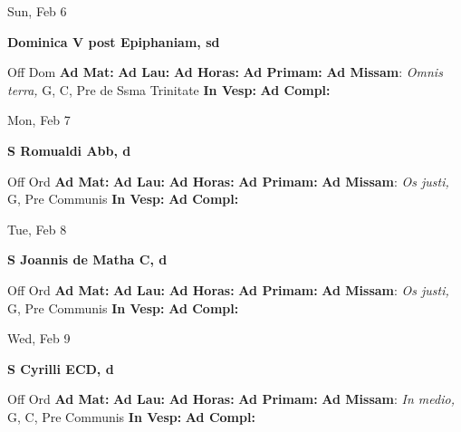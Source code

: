 \documentclass[10pt]{article}
\begin{document}
\begin{minipage}{3.5in}
\vspace{2em}\begin{center}
Sun, Feb 6
\end{center}\textbf{ \large Dominica V post Epiphaniam, \textnormal{\normalsize sd}}
\begin{justify}
Off Dom
\textbf{Ad Mat: }
\textbf{Ad Lau: }
\textbf{Ad Horas: }
\textbf{Ad Primam: }
\textbf{Ad Missam}: \textit{Omnis terra,} G, C, Pre de Ssma Trinitate
\textbf{In Vesp: }
\textbf{Ad Compl: }\end{justify}
\end{minipage}



\begin{minipage}{3.5in}
\vspace{2em}\begin{center}
Mon, Feb 7
\end{center}\textbf{ \large S Romualdi Abb, \textnormal{\normalsize d}}
\begin{justify}
Off Ord
\textbf{Ad Mat: }
\textbf{Ad Lau: }
\textbf{Ad Horas: }
\textbf{Ad Primam: }
\textbf{Ad Missam}: \textit{Os justi,} G, Pre Communis
\textbf{In Vesp: }
\textbf{Ad Compl: }\end{justify}
\end{minipage}



\begin{minipage}{3.5in}
\vspace{2em}\begin{center}
Tue, Feb 8
\end{center}\textbf{ \large S Joannis de Matha C, \textnormal{\normalsize d}}
\begin{justify}
Off Ord
\textbf{Ad Mat: }
\textbf{Ad Lau: }
\textbf{Ad Horas: }
\textbf{Ad Primam: }
\textbf{Ad Missam}: \textit{Os justi,} G, Pre Communis
\textbf{In Vesp: }
\textbf{Ad Compl: }\end{justify}
\end{minipage}



\begin{minipage}{3.5in}
\vspace{2em}\begin{center}
Wed, Feb 9
\end{center}\textbf{ \large S Cyrilli ECD, \textnormal{\normalsize d}}
\begin{justify}
Off Ord
\textbf{Ad Mat: }
\textbf{Ad Lau: }
\textbf{Ad Horas: }
\textbf{Ad Primam: }
\textbf{Ad Missam}: \textit{In medio,} G, C, Pre Communis
\textbf{In Vesp: }
\textbf{Ad Compl: }\end{justify}
\end{minipage}
\end{document}
